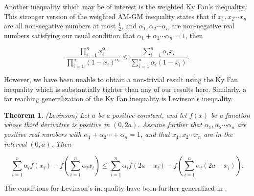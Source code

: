 \documentclass{article}
\newtheorem{theorem}{Theorem}
\begin{document}




Another inequality which may be of interest is the weighted Ky Fan's inequality. This  stronger version of the weighted AM-GM inequality states that if $x_1, x_2 \cdots x_n$ are all non-negative numbers at most $\frac{1}{2}$, and $\alpha_1, \alpha_2 \cdots \alpha_n$ are non-negative real numbers satisfying our usual condition that $\alpha_1 + \alpha_2 \cdots \alpha_n=1$, then 

\begin{equation} \frac{ \prod_{i=1}^n x_i^{\alpha_i} }{ \prod_{i=1}^n (1-x_i)^{\alpha_i} }  \leq \frac{ \sum_{i=1}^n \alpha_i x_i }{ \sum_{i=1}^n \alpha_i (1-x_i) } \label{Weighted Ky Fan}.
\end{equation}

However, we have been unable to obtain a non-trivial result using the Ky Fan inequality which is substantially tighter than any of our results here. %
Similarly, a far reaching generalization of the Ky Fan inequality is Levinson's inequality. 

\begin{theorem}(Levinson)\cite{Levinson}
Let $a$ be a positive constant, and let $f(x)$ be a function whose third derivative is positive in $(0,2a)$. Assume further that 
$\alpha_1, \alpha_2 \cdots \alpha_n$ are positive real numbers with $\alpha_1 + \alpha_2 \cdots +\alpha_n =1$, and that $x_1, x_2 \cdots x_n$ are in the interval $(0,a)$. Then

\begin{equation}\label{Levinson inequality}
\sum_{i=1}^n \alpha_i f(x_i) -f\left(\sum_{i=1}^n\alpha_ix_i\right) \leq \sum_{i=1}^n\alpha_i f(2a-x_i)-f\left(\sum_{i=1}^n\alpha_i(2a-x_i)\right).
\end{equation}
\end{theorem}

 The conditions for Levinson's inequality have been further generalized in \cite{LawSeg}. 
\end{document}
